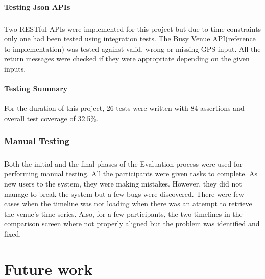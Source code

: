 \documentclass{l4proj}
\begin{document}
\subsubsection{Testing Json APIs}
\paragraph{}
Two RESTful APIs were implemented for this project but due to time constraints only one had been tested using integration tests. The Busy Venue API(reference to implementation) was tested against valid, wrong or missing GPS input. All the return messages were checked if they were appropriate depending on the given inputs.

\subsubsection{Testing Summary}
For the duration of this project, 26 tests were written with 84 assertions and overall test coverage of 32.5\%.

\subsection{Manual Testing}
\paragraph{}
Both the initial and the final phases of the Evaluation process were used for performing manual testing. All the participants were given tasks to complete. As new users to the system, they were making mistakes. However, they did not manage to break the system but a few bugs were discovered. There were few cases when the timeline was not loading when there was an attempt to retrieve the venue's time series. Also, for a few participants, the two timelines in the comparison screen where not properly aligned but the problem was identified and fixed.
 

\chapter{Future work}

\begin{appendices}

\end{appendices}




\end{document}
